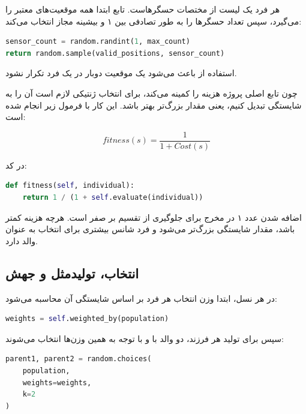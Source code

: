 \documentclass[10.5pt]{exam}
\begin{document}
هر فرد یک لیست از مختصات حسگرهاست. تابع
ابتدا همه موقعیت‌های معتبر را می‌گیرد، سپس تعداد حسگرها را به طور تصادفی بین ۱ و بیشینه مجاز انتخاب می‌کند:

\begin{latin}
\begin{lstlisting}[language=Python]
sensor_count = random.randint(1, max_count)
return random.sample(valid_positions, sensor_count)
\end{lstlisting}
\end{latin}

استفاده از
باعث می‌شود یک موقعیت دوبار در یک فرد تکرار نشود.

چون تابع اصلی پروژه هزینه را کمینه می‌کند، برای انتخاب ژنتیکی لازم است آن را به شایستگی تبدیل کنیم، یعنی مقدار بزرگ‌تر بهتر باشد. این کار با فرمول زیر انجام شده است:

\[
    fitness(s) = \frac{1}{1 + Cost(s)}
\]

در کد:

\begin{latin}
\begin{lstlisting}[language=Python]
def fitness(self, individual):
    return 1 / (1 + self.evaluate(individual))
\end{lstlisting}
\end{latin}

اضافه شدن عدد ۱ در مخرج برای جلوگیری از تقسیم بر صفر است. هرچه هزینه کمتر باشد، مقدار شایستگی بزرگ‌تر می‌شود و فرد شانس بیشتری برای انتخاب به عنوان والد دارد.

\subsection{انتخاب، تولیدمثل و جهش}
در هر نسل، ابتدا وزن انتخاب هر فرد بر اساس شایستگی آن محاسبه می‌شود:

\begin{latin}
\begin{lstlisting}[language=Python]
weights = self.weighted_by(population)
\end{lstlisting}
\end{latin}

سپس برای تولید هر فرزند، دو والد با
و با توجه به همین وزن‌ها انتخاب می‌شوند:

\begin{latin}
\begin{lstlisting}[language=Python]
parent1, parent2 = random.choices(
    population,
    weights=weights,
    k=2
)
\end{lstlisting}
\end{latin}
\end{document}
